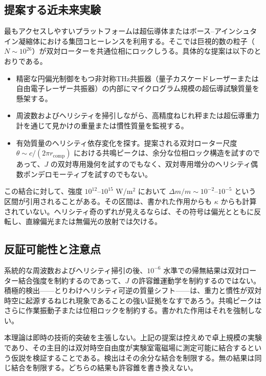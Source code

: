 \documentclass[a4paper]{article}
\begin{document}
\subsection{提案する近未来実験}

最もアクセスしやすいプラットフォームは超伝導体またはボース--アインシュタイン凝縮体における集団コヒーレンスを利用する。そこでは巨視的数の粒子（$N \sim 10^{26}$）が双対ローターを共通位相にロックしうる。具体的な提案は以下のとおりである。

\begin{itemize}
\item 精密な円偏光制御をもつ非対称THz共振器（量子カスケードレーザーまたは自由電子レーザー共振器）の内部にマイクログラム規模の超伝導試験質量を懸架する。
\item 周波数およびヘリシティを掃引しながら、高精度ねじれ秤または超伝導重力計を通じて見かけの重量または慣性質量を監視する。
\item 有効質量のヘリシティ依存変化を探す。提案される双対ローター尺度 $\theta \sim c / (2\pi r_\text{comp})$ における共鳴ピークは、余分な位相ロック構造を試すのであって、$J$ の双対専用幾何を試すのでもなく、双対専用増分のヘリシティ偶数ポンデロモーティブを試すのでもない。
\end{itemize}

この結合に対して、強度 \(10^{12}\)--\(10^{15}\) W/m\(^2\) において \(\Delta m / m \sim 10^{-2}\)--\(10^{-5}\) という区間が引用されることがある。その区間は、書かれた作用からも \(\kappa\) からも計算されていない。ヘリシティ奇のずれが見えるならば、その符号は偏光とともに反転し、直線偏光または無偏光の放射では欠ける。

\subsection{反証可能性と注意点}

系統的な周波数およびヘリシティ掃引の後、$10^{-6}$ 水準での帰無結果は双対ローター結合強度を制約するのであって、$J$ の許容錐運動学を制約するのではない。積極的検出——とりわけヘリシティ可逆の質量シフト——は、重力と慣性が双対時空に起源するねじれ現象であることの強い証拠をなすであろう。共鳴ピークはさらに作業振動子または位相ロックを制約する。書かれた作用はそれを強制しない。

本理論は即時の技術的突破を主張しない。上記の提案は控えめで卓上規模の実験であり、その主目的は双対時空自由度が実験室電磁場に測定可能に結合するという仮説を検証することである。検出はその余分な結合を制限する。無の結果は同じ結合を制限する。どちらの結果も許容錐を書き換えない。
\end{document}
